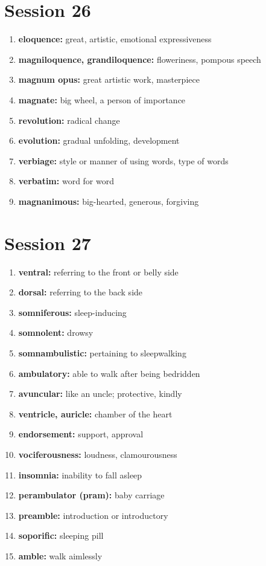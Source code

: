 \documentclass{article}
\begin{document}
\section{Session 26}
\begin{enumerate}
    \item \textbf{eloquence: }{great, artistic, emotional expressiveness}
    \item \textbf{magniloquence, grandiloquence: }{floweriness, pompous speech}
    \item \textbf{magnum opus: }{great artistic work, masterpiece}
    \item \textbf{magnate: }{big wheel, a person of importance}
    \item \textbf{revolution: }{radical change}
    \item \textbf{evolution: }{gradual unfolding, development}
    \item \textbf{verbiage: }{style or manner of using words, type of words}
    \item \textbf{verbatim: }{word for word}
    \item \textbf{magnanimous: }{big-hearted, generous, forgiving}
    
\end{enumerate}

\section{Session 27}
\begin{enumerate}
    \item \textbf{ventral: }{referring to the front or belly side}
    \item \textbf{dorsal: }{referring to the back side}
    \item \textbf{somniferous: }{sleep-inducing}
    \item \textbf{somnolent: }{drowsy}
    \item \textbf{somnambulistic: }{pertaining to sleepwalking}
    \item \textbf{ambulatory: }{able to walk after being bedridden}
    \item \textbf{avuncular: }{like an uncle; protective, kindly}
    \item \textbf{ventricle, auricle: }{chamber of the heart}
    \item \textbf{endorsement: }{support, approval}
    \item \textbf{vociferousness: }{loudness, clamourousness}
    \item \textbf{insomnia: }{inability to fall asleep}
    \item \textbf{perambulator (pram): }{baby carriage}
    \item \textbf{preamble: }{introduction or introductory}
    \item \textbf{soporific: }{sleeping pill}
    \item \textbf{amble: }{walk aimlessly}
    
\end{enumerate}
\end{document}
